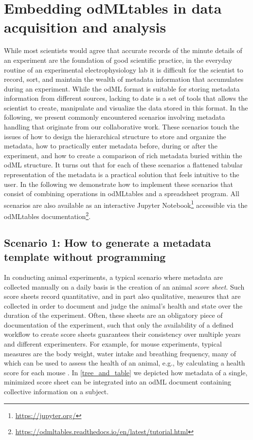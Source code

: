 \section{Embedding odMLtables in data acquisition and analysis}
\label{sec:Illustrative-Examples}

While most scientists would agree that accurate records of the minute details of an experiment are the foundation of good scientific practice, in the everyday routine of an experimental electrophysiology lab it is difficult for the scientist to record, sort, and maintain the wealth of metadata information that accumulates during an experiment. While the odML format is suitable for storing metadata information from different sources, lacking to date is a set of tools that allows the scientist to create, manipulate and visualize the data stored in this format. In the following, we present commonly encountered scenarios involving metadata handling that originate from our collaborative work. These scenarios touch the issues of how to design the hierarchical structure to store and organize the metadata, how to practically enter metadata before, during or after the experiment, and how to create a comparison of rich metadata buried within the odML structure. It turns out that for each of these scenarios a flattened tabular representation of the metadata is a practical solution that feels intuitive to the user. In the following we demonstrate how to implement these scenarios that consist of combining operations in odMLtables and a spreadsheet program. All scenarios are also available as an interactive Jupyter Notebook\footnote{\url{https://jupyter.org/}} accessible via the odMLtables documentation\footnote{\url{https://odmltables.readthedocs.io/en/latest/tutorial.html}}.

\subsection*{Scenario 1: How to generate a metadata template without programming}
\label{sec:Template-Generation}
In conducting animal experiments, a typical scenario where metadata are collected manually on a daily basis is the creation of an animal \textit{score sheet}. Such score sheets record quantitative, and in part also qualitative, measures that are collected in order to document and judge the animal's health and state over the duration of the experiment. Often, these sheets are an obligatory piece of documentation of the experiment, such that only the availability of a defined workflow to create score sheets guarantees their consistency over multiple years and different experimenters. For example, for mouse experiments, typical measures are the body weight, water intake and breathing frequency, many of which can be used to assess the health of an animal, e.g., by calculating a health score for each mouse \citep{foltz_guidelines_1999, burkholder_health_2012}. In \cref{tree_and_table} we depicted how metadata of a single, minimized score sheet can be integrated into an odML document containing collective information on a subject.

